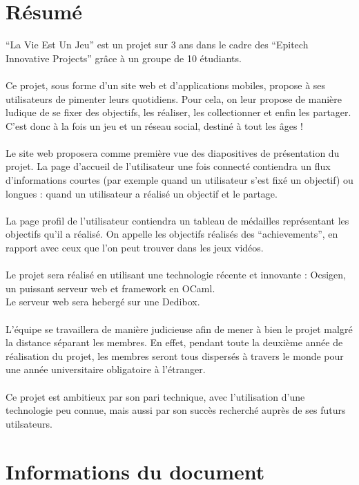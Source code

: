 \documentclass{life-fr}
\begin{document}
\chapter*{Résumé}
{
  ``La Vie Est Un Jeu'' est un projet sur 3 ans dans le cadre des ``Epitech
  Innovative Projects'' grâce à un groupe de 10 étudiants.\\
  \\
  Ce projet, sous forme d'un site web et d'applications mobiles, propose à
  ses utilisateurs de pimenter leurs quotidiens. Pour cela, on leur propose
  de manière ludique de se fixer des objectifs, les réaliser, les collectionner
  et enfin les partager.\\
  C'est donc à la fois un jeu et un réseau social, destiné à tout les âges !\\
  \\
  Le site web proposera comme première vue des diapositives de présentation du
  projet. La page d'accueil de l'utilisateur une fois connecté contiendra un
  flux d'informations courtes (par exemple quand un utilisateur s'est fixé un
  objectif) ou longues : quand un utilisateur a réalisé un objectif et le partage.
  \\\\
  La page profil de l'utilisateur contiendra un tableau de médailles représentant
  les objectifs qu'il a réalisé. On appelle les objectifs réalisés des
  ``achievements'', en rapport avec ceux que l'on peut trouver dans les jeux
  vidéos.\\
  \\
  Le projet sera réalisé en utilisant une technologie récente et innovante :
  Ocsigen, un puissant serveur web et framework en OCaml.\\
  Le serveur web sera hebergé sur une Dedibox.\\
  \\
  L'équipe se travaillera de manière judicieuse afin de mener à bien le projet
  malgré la distance séparant les membres. En effet, pendant toute la deuxième
  année de réalisation du projet, les membres seront tous dispersés à travers
  le monde pour une année universitaire obligatoire à l'étranger.\\
  \\
  Ce projet est ambitieux par son pari technique, avec l'utilisation d'une
  technologie peu connue, mais aussi par son succès recherché auprès de ses
  futurs utilsateurs.
}

\chapter*{Informations du document}
\end{document}
